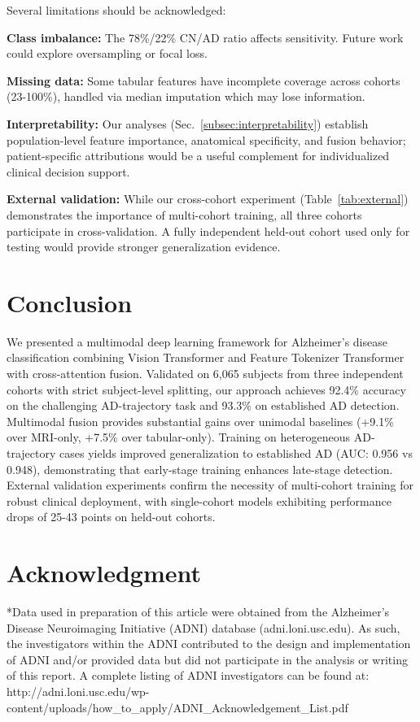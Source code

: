 \documentclass[conference]{IEEEtran}
\begin{document}
Several limitations should be acknowledged:

\textbf{Class imbalance:} The 78\%/22\% CN/AD ratio affects sensitivity. Future work could explore oversampling or focal loss.

\textbf{Missing data:} Some tabular features have incomplete coverage across cohorts (23-100\%), handled via median imputation which may lose information.

\textbf{Interpretability:} Our analyses (Sec.~\ref{subsec:interpretability}) establish population-level feature importance, anatomical specificity, and fusion behavior; patient-specific attributions would be a useful complement for individualized clinical decision support.

\textbf{External validation:} While our cross-cohort experiment (Table~\ref{tab:external}) demonstrates the importance of multi-cohort training, all three cohorts participate in cross-validation. A fully independent held-out cohort used only for testing would provide stronger generalization evidence.

\section{Conclusion}

We presented a multimodal deep learning framework for Alzheimer's disease classification combining Vision Transformer and Feature Tokenizer Transformer with cross-attention fusion. Validated on 6,065 subjects from three independent cohorts with strict subject-level splitting, our approach achieves 92.4\% accuracy on the challenging AD-trajectory task and 93.3\% on established AD detection. Multimodal fusion provides substantial gains over unimodal baselines (+9.1\% over MRI-only, +7.5\% over tabular-only). Training on heterogeneous AD-trajectory cases yields improved generalization to established AD (AUC: 0.956 vs 0.948), demonstrating that early-stage training enhances late-stage detection. External validation experiments confirm the necessity of multi-cohort training for robust clinical deployment, with single-cohort models exhibiting performance drops of 25-43 points on held-out cohorts.

\section*{Acknowledgment}

*Data used in preparation of this article were obtained from the Alzheimer's Disease Neuroimaging Initiative (ADNI) database (adni.loni.usc.edu). As such, the investigators within the ADNI contributed to the design and implementation of ADNI and/or provided data but did not participate in the analysis or writing of this report. A complete listing of ADNI investigators can be found at: http://adni.loni.usc.edu/wp-content/uploads/how\_to\_apply/ADNI\_Acknowledgement\_List.pdf
\end{document}
